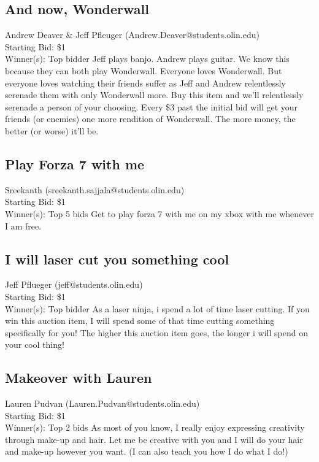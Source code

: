 \documentclass[11pt]{article}
\begin{document}
\subsection{And now, Wonderwall}
Andrew Deaver \& Jeff Pfleuger (Andrew.Deaver@students.olin.edu) \\
Starting Bid: \$1 \\
Winner(s): 
Top bidder\newline
Jeff plays banjo. Andrew plays guitar. We know this because they can both play Wonderwall. Everyone loves Wonderwall. But everyone loves watching their friends suffer as Jeff and Andrew relentlessly serenade them with only Wonderwall more. Buy this item and we'll relentlessly serenade a person of your choosing. Every \$3 past the initial bid will get your friends (or enemies) one more rendition of Wonderwall. The more money, the better (or worse) it'll be.
\subsection{Play Forza 7 with me}
Sreekanth (sreekanth.sajjala@students.olin.edu) \\
Starting Bid: \$1 \\
Winner(s): 
Top 5 bids\newline
Get to play forza 7 with me on my xbox with me whenever I am free.
\subsection{I will laser cut you something cool}
Jeff Pflueger (jeff@students.olin.edu) \\
Starting Bid: \$1 \\
Winner(s): 
Top bidder\newline
As a laser ninja, i spend a lot of time laser cutting. If you win this auction item, I will spend some of that time cutting something specifically for you! The higher this auction item goes, the longer i will spend on your cool thing!
\subsection{Makeover with Lauren}
Lauren Pudvan (Lauren.Pudvan@students.olin.edu) \\
Starting Bid: \$1 \\
Winner(s): 
Top 2 bids\newline
As most of you know, I really enjoy expressing creativity through make-up and hair. Let me be creative with you and I will do your hair and make-up however you want. (I can also teach you how I do what I do!)
\end{document}
